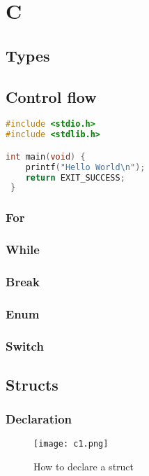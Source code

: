 \documentclass[12pt,a4paper]{article}
\begin{document}
\section{C}

\subsection{Types}

\subsection{Control flow}
\begin{center}
\begin{lstlisting}[language=C]
#include <stdio.h>
#include <stdlib.h>

int main(void) {
	printf("Hello World\n");
	return EXIT_SUCCESS;
 }
\end{lstlisting}
\end{center}

\subsubsection{For}
\subsubsection{While}
\subsubsection{Break}
\subsubsection{Enum}
\subsubsection{Switch}

\subsection{Structs}
\subsubsection{Declaration}

\begin{figure}[!htbp]
	\centering
	\texttt{[image: c1.png]}
	\caption{How to declare a struct}
	\label{fig:struct_declaration}
\end{figure}
\end{document}
